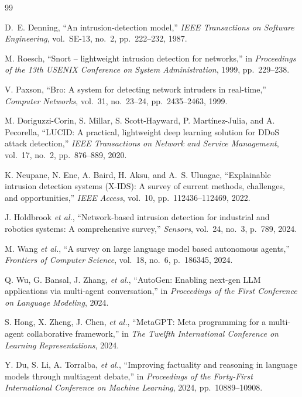\begin{thebibliography}{99}

D.~E. Denning, ``An intrusion-detection model,'' \emph{IEEE Transactions on Software Engineering}, vol.~SE-13, no.~2, pp.~222--232, 1987.

M. Roesch, ``Snort -- lightweight intrusion detection for networks,'' in \emph{Proceedings of the 13th USENIX Conference on System Administration}, 1999, pp.~229--238.

V. Paxson, ``Bro: A system for detecting network intruders in real-time,'' \emph{Computer Networks}, vol.~31, no.~23--24, pp.~2435--2463, 1999.

M. Doriguzzi-Corin, S. Millar, S. Scott-Hayward, P. Mart{\'i}nez-Julia, and A. Pecorella, ``LUCID: A practical, lightweight deep learning solution for DDoS attack detection,'' \emph{IEEE Transactions on Network and Service Management}, vol.~17, no.~2, pp.~876--889, 2020.

K. Neupane, N. Ene, A. Baird, H. Aksu, and A.~S. Uluagac, ``Explainable intrusion detection systems (X-IDS): A survey of current methods, challenges, and opportunities,'' \emph{IEEE Access}, vol.~10, pp.~112436--112469, 2022.

J. Holdbrook \emph{et al.}, ``Network-based intrusion detection for industrial and robotics systems: A comprehensive survey,'' \emph{Sensors}, vol.~24, no.~3, p.~789, 2024.

M. Wang \emph{et al.}, ``A survey on large language model based autonomous agents,'' \emph{Frontiers of Computer Science}, vol.~18, no.~6, p.~186345, 2024.

Q. Wu, G. Bansal, J. Zhang, \emph{et al.}, ``AutoGen: Enabling next-gen LLM applications via multi-agent conversation,'' in \emph{Proceedings of the First Conference on Language Modeling}, 2024.

S. Hong, X. Zheng, J. Chen, \emph{et al.}, ``MetaGPT: Meta programming for a multi-agent collaborative framework,'' in \emph{The Twelfth International Conference on Learning Representations}, 2024.

Y. Du, S. Li, A. Torralba, \emph{et al.}, ``Improving factuality and reasoning in language models through multiagent debate,'' in \emph{Proceedings of the Forty-First International Conference on Machine Learning}, 2024, pp.~10889--10908.


\end{thebibliography}
